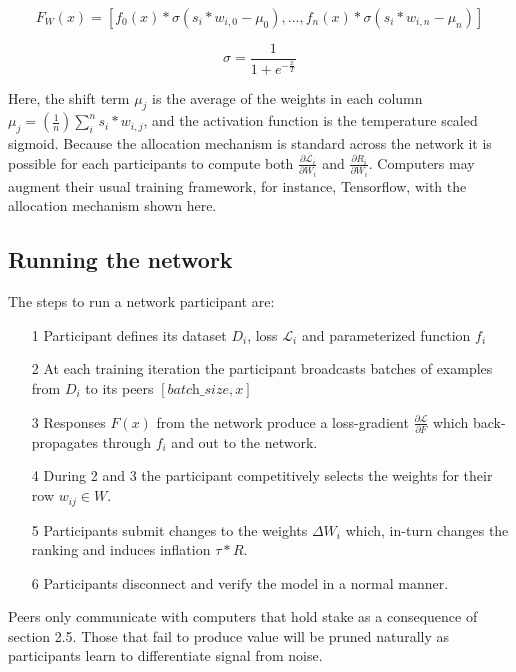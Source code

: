 \documentclass{article}
\begin{document}
\begin{equation}
F_W(x) =  [f_0(x) * \sigma(s_i * w_{i,0} - \mu_0),  ... , f_n(x) * \sigma(s_i * w_{i,n} - \mu_n)]
\end{equation}

\begin{equation}
\sigma =  \frac{1}{ 1 + e^{-\frac{x}{T}} }
\end{equation}

Here, the shift term $\mu_j$ is the average of the weights in each column $\mu_j = (\frac{1}{n}) \sum_{i}^{n}{s_i * w_{i,j}}$, and the activation function is the temperature scaled sigmoid. Because the allocation mechanism is standard across the network it is possible for each participants to compute both $\frac{\partial \mathcal{L}_i}{\partial W_i}$ and $\frac{\partial R_i}{\partial W_i}$. Computers may augment their usual training framework, for instance, Tensorflow, with the allocation mechanism shown here. 
\bigskip

\subsection{Running the network}

The steps to run a network participant are:
\begin{itemize}

\item[1]  Participant defines its dataset $D_i$, loss $\mathcal{L}_i$ and parameterized function $f_i$
\item[2]  At each training iteration the participant broadcasts batches of examples from $D_i$ to its peers $[\textit{batch\_size}, x]$
\item[3]  Responses $F(x)$ from the network produce a loss-gradient $\frac{\partial \mathcal{L}}{\partial F}$ which back-propagates through $f_i$ and out to the network.
\item[4]  During 2 and 3 the participant competitively selects the weights for their row $w_{ij} \in W$.
\item[5]  Participants submit changes to the weights $\Delta W_i$ which, in-turn changes the ranking and induces inflation $\tau * R$.
\item[6]  Participants disconnect and verify the model in a normal manner.
\end{itemize}

Peers only communicate with computers that hold stake as a consequence of section 2.5. Those that fail to produce value will be pruned naturally as participants learn to differentiate signal from noise.
\end{document}
